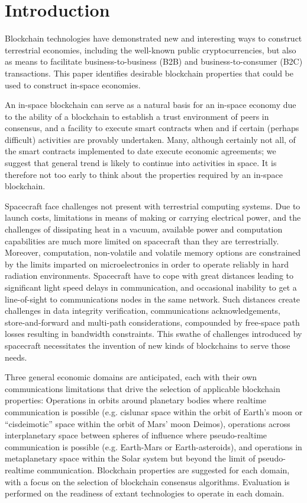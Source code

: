 \documentclass[journal ]{new-aiaa}
\begin{document}
\section{Introduction}

Blockchain technologies have demonstrated new and interesting ways to construct terrestrial economies, including the well-known public cryptocurrencies, but also as means to facilitate business-to-business (B2B) and business-to-consumer (B2C) transactions. This paper identifies desirable blockchain properties that could be used to construct in-space economies.

An in-space blockchain can serve as a natural basis for an in-space economy due to the ability of a blockchain to establish a trust environment of peers in consensus, and a facility to execute smart contracts when and if certain (perhaps difficult) activities are provably undertaken. Many, although certainly not all, of the smart contracts implemented to date execute economic agreements; we suggest that general trend is likely to continue into activities in space. It is therefore not too early to think about the properties required by an in-space blockchain.

Spacecraft face challenges not present with terrestrial computing systems. Due to launch costs, limitations in means of making or carrying electrical power, and the challenges of dissipating heat in a vacuum, available power and computation capabilities are much more limited on spacecraft than they are terrestrially. Moreover, computation, non-volatile and volatile memory options are constrained by the limits imparted on microelectronics in order to operate reliably in hard radiation environments.  Spacecraft have to cope with great distances leading to significant light speed delays in communication, and occasional inability to get a line-of-sight to communications nodes in the same network.  Such distances create challenges in data integrity verification, communications acknowledgements, store-and-forward and multi-path considerations, compounded by free-space path losses resulting in bandwidth constraints. This swathe of challenges introduced by spacecraft necessitates the invention of new kinds of blockchains to serve those needs.

Three general economic domains are anticipated, each with their own communications limitations that drive the selection of applicable blockchain properties: Operations in orbits around planetary bodies where realtime communication is possible (e.g. cislunar space within the orbit of Earth's moon or ``cisdeimotic'' space within the orbit of Mars' moon Deimos), operations across interplanetary space between spheres of influence where pseudo-realtime communication is possible (e.g. Earth-Mars or Earth-asteroids), and operations in metaplanetary space within the Solar system but beyond the limit of pseudo-realtime communication. Blockchain properties are suggested for each domain, with a focus on the selection of blockchain consensus algorithms. Evaluation is performed on the readiness of extant technologies to operate in each domain.
\end{document}
